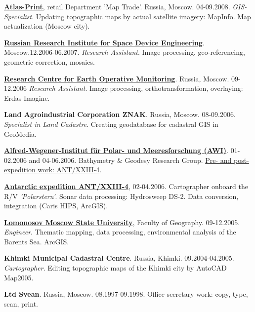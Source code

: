 \documentclass[10pt]{article}
\begin{document}
\href{http://atlas-print.ru/}{\textbf{Atlas-Print}}, retail Department 'Map Trade'. Russia, Moscow. 04-09.2008. \textit{GIS-Specialist}. Updating topographic maps by actual satellite imagery: MapInfo. Map actualization (Moscow city).
\vspace{5pt}

\href{http://www.rniikp.ru/}{\textbf{Russian Research Institute for Space Device Engineering}}. Moscow.12.2006-06.2007. \textit{Research Assistant}. Image processing, geo-referencing, geometric correction, mosaics.
\vspace{5pt}

\href{http://eng.ntsomz.ru/}{\textbf{Research Centre for Earth Operative Monitoring}}. Russia, Moscow. 09-12.2006 \textit{Research Assistant}. Image processing, orthotransformation, overlaying: Erdas Imagine.
\vspace{5pt}

\textbf{Land Agroindustrial Corporation ZNAK}. Russia, Moscow. 08-09.2006. \textit{Specialist in Land Cadastre}. Creating geodatabase for cadastral GIS in GeoMedia.
\vspace{5pt}

\href{https://www.awi.de/}{\textbf{Alfred-Wegener-Institut f\"{u}r Polar- und Meeresforschung (AWI)}}. 01-02.2006 and 04-06.2006. Bathymetry \& Geodesy Research Group. \href{https://www.researchgate.net/project/2006-Antarctica-South-Pacific-Ocean-Bathymetric-Surveying-in-Amundsen-Bellingshausen-Seas-ANT-XXIII-4}{Pre- and post-expedition work: ANT/XXIII-4}.
\vspace{5pt}

\href{http://www.ats.aq/documents/ie/deanu06e.pdf}{\textbf{Antarctic expedition ANT/XXIII-4}}, 02-04.2006. Cartographer onboard the R/V \textit{'Polarstern'}. Sonar data processing: Hydrosweep DS-2. Data conversion, integration (Caris HIPS, ArcGIS). 
\vspace{5pt}

\href{http://www.msu.ru/en/}{\textbf{Lomonosov Moscow State University}}, Faculty of Geography. 09-12.2005. \textit{Engineer}. Thematic mapping, data processing, environmental analysis of the Barents Sea. ArcGIS.
\vspace{5pt}

\textbf{Khimki Municipal Cadastral Centre}. Russia, Khimki. 09.2004-04.2005. \textit{Cartographer}. Editing topographic maps of the Khimki city by AutoCAD Map2005. 
\vspace{5pt}

\textbf{Ltd Svean}. Russia, Moscow. 08.1997-09.1998. Office secretary work: copy, type, scan, print. 
\end{document}
